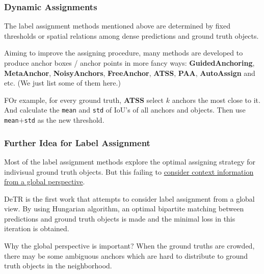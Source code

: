 \documentclass[slidetop, mathserif, dvipsnames]{beamer}
\begin{document}
\begin{frame}
    \frametitle{Dynamic Assignments}

    The label assignment methods mentioned above are determined by fixed thresholds
    or spatial relations among dense predictions and ground truth objects.

    \quad

    Aiming to improve the assigning procedure, many methods are developed
    to produce anchor boxes / anchor points in more fancy ways:
    {\bf GuidedAnchoring}, {\bf MetaAnchor}, {\bf NoisyAnchors},
    {\bf FreeAnchor}, {\bf ATSS}, {\bf PAA}, {\bf AutoAssign} and etc.
    (We just list some of them here.)

    \quad

    FOr example, for every ground truth, {\bf ATSS} select $k$ anchors the most
    close to it. And calculate the {\tt mean} and {\tt std} of IoU's of all
    anchors and objects.
    Then use {\tt mean$+$std} as the new threshold.

\end{frame}

\begin{frame}
    \frametitle{Further Idea for Label Assignment}

    Most of the label assignment methods explore the optimal assigning strategy
    for indivisual ground truth objects. But this failing to
    \underline{consider context information from a global perspective}.

    \quad

    DeTR is the first work that attempts to consider label assignment from
    a global view. By using Hungarian algorithm,
    an optimal bipartite matching between predictions
    and ground truth objects is made and the minimal loss in this iteration
    is obtained.

    \quad

    Why the global perspective is important?
    When the ground truths are crowded, there may be some ambiguous
    anchors which are hard to distribute to ground truth
    objects in the neighborhood.

\end{frame}
\end{document}
